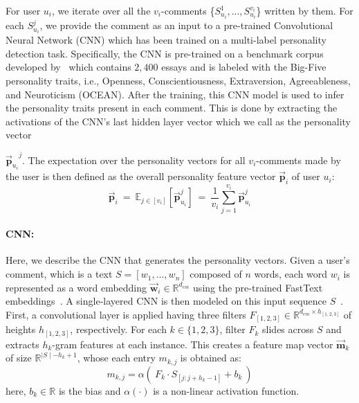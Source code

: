 \documentclass[11pt]{article}
\begin{document}
For user $u_i$, we iterate over all the $v_i$-comments \{$S_{u_i}^1, ..., S_{u_i}^{v_i}$\} written by them. For each $S_{u_i}^j$, we provide the comment as an input to a pre-trained Convolutional Neural Network (CNN) which has been trained on a multi-label personality detection task. Specifically, the CNN is pre-trained on a benchmark corpus developed by~ which contains $2,400$ essays and is labeled with the Big-Five personality traits, i.e., Openness, Conscientiousness, Extraversion, Agreeableness, and Neuroticism (OCEAN). After the training, this CNN model is used to infer the personality traits present in each comment. This is done by extracting the activations of the CNN's last hidden layer vector which we call as the personality vector {${\vec{\bm{p}}_{u_i}}^j$. The expectation over the personality vectors for all $v_i$-comments made by the user is then defined as the overall personality feature vector $\bm{\vec{p}}_{i}$ of user $u_i$:
\begin{equation}
\bm{\vec{p}}_{i} \ = \ \mathbb{E}_{j\in [v_i]} [ \vec{\bm{p}}_{u_i}^j ] \ = \ \frac{1}{v_i}\sum_{j=1}^{v_i} \vec{\bm{p}}_{u_i}^j
\end{equation}
\paragraph{CNN:}
Here, we describe the CNN that generates the personality vectors. Given a user's comment, which is a text $S = [w_1, ..., w_n]$ composed of $n$ words, each word $w_i$ is represented as a word embedding $\vec{\bm{w}}_i \in \mathbb{R}^{d_{em}}$  using the pre-trained FastText embeddings~\cite{bojanowski2016enriching}. A single-layered CNN is then modeled on this input sequence $S$~\cite{kim2014convolutional}. First, a convolutional layer is applied having three filters $F_{[1,2,3]} \in \mathbb{R}^{d_{em} \times h_{[1,2,3]}}$ of heights $h_{[1,2,3]}$, respectively. For each $k \in \{1,2,3 \}$, filter $F_k$ slides across $S$ and extracts $h_k$-gram features at each instance.  This creates a feature map vector $\vec{\bm{m}}_k$ of size $\mathbb{R}^{\mid S \mid - h_k + 1}$, whose each entry $m_{k,j}$ is obtained as:
\begin{equation}
m_{k,j} = \alpha ( \ {F_k \cdot S_{[j:j+h_k-1]} + b_k} \ )
\end{equation}
here, $b_k \in \mathbb{R}$ is the bias and $\alpha(\cdot)$ is a non-linear activation function.

}
\end{document}
